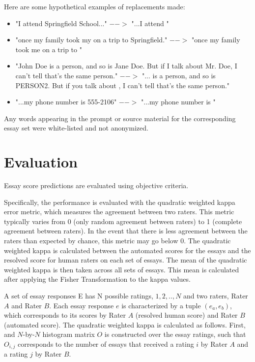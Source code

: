 \documentclass[BTech]{nitkdiss}
\begin{document}
Here are some hypothetical examples of replacements made:
\begin{itemize}
\item{"I attend Springfield School..." $-->$ "...I attend "}
\item{"once my family took my on a trip to Springfield." $-->$ "once my family took me on a trip to "}
\item{"John Doe is a person, and so is Jane Doe. But if I talk about Mr. Doe, I can't tell that's the same person." $-->$ "... is a person, and so is PERSON2. But if you talk about , I can't tell that's the same person."}
\item{"...my phone number is 555-2106" $-->$ "...my phone number is "}
\end{itemize}
Any words appearing in the prompt or source material for the corresponding essay set were white-listed and not anonymized.



\section{Evaluation}
Essay score predictions are evaluated using objective criteria.

Specifically, the performance is evaluated with the quadratic weighted kappa error metric, which measures the agreement between two raters.  This metric typically varies from 0 (only random agreement between raters) to 1 (complete agreement between raters).  In the event that there is less agreement between the raters than expected by chance, this metric may go below 0.  The quadratic weighted kappa is calculated between the automated scores for the essays and the resolved score for human raters on each set of essays.  The mean of the quadratic weighted kappa is then taken across all sets of essays.  This mean is calculated after applying the Fisher Transformation to the kappa values.

A set of essay responses E has N possible ratings, $1, 2,.., N$ and two raters, Rater $A$ and Rater $B$.  Each essay response $e$ is characterized by a tuple $(e_a,e_b)$, which corresponds to its scores by Rater $A$ (resolved human score) and Rater $B$ (automated score).  The quadratic weighted kappa is calculated as follows.  First, and $N$-by-$N$ histogram matrix $O$ is constructed over the essay ratings, such that $O_{i,j}$ corresponds to the number of essays that received a rating $i$ by Rater $A$ and a rating $j$ by Rater $B$.
\end{document}

